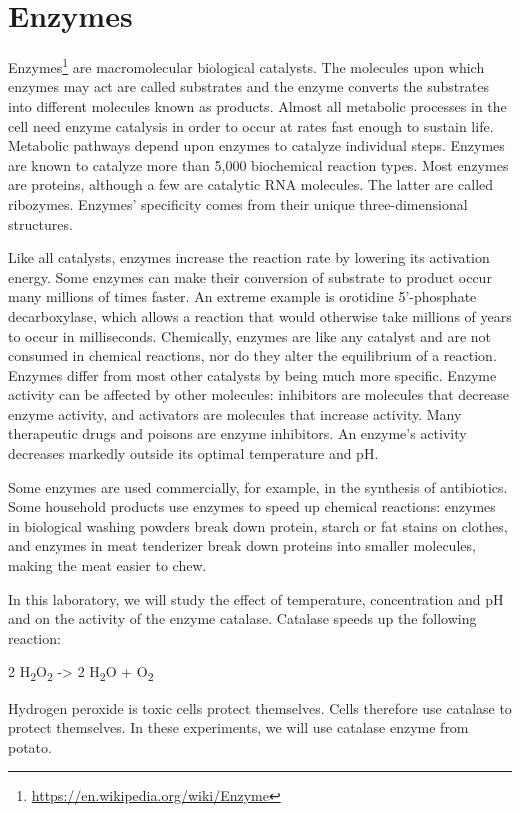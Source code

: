 \documentclass[]{book}
\let\rmarkdownfootnote\footnote%
\def\footnote{\protect\rmarkdownfootnote}
\renewcommand{\href}[2]{#2\footnote{\url{#1}}}
\theoremstyle{definition}
\theoremstyle{definition}
\theoremstyle{definition}
\theoremstyle{remark}
\begin{document}
\chapter{Enzymes}\label{enzymes}

\href{https://en.wikipedia.org/wiki/Enzyme}{Enzymes} are macromolecular
biological catalysts. The molecules upon which enzymes may act are
called substrates and the enzyme converts the substrates into different
molecules known as products. Almost all metabolic processes in the cell
need enzyme catalysis in order to occur at rates fast enough to sustain
life. Metabolic pathways depend upon enzymes to catalyze individual
steps. Enzymes are known to catalyze more than 5,000 biochemical
reaction types. Most enzymes are proteins, although a few are catalytic
RNA molecules. The latter are called ribozymes. Enzymes' specificity
comes from their unique three-dimensional structures.

Like all catalysts, enzymes increase the reaction rate by lowering its
activation energy. Some enzymes can make their conversion of substrate
to product occur many millions of times faster. An extreme example is
orotidine 5'-phosphate decarboxylase, which allows a reaction that would
otherwise take millions of years to occur in milliseconds. Chemically,
enzymes are like any catalyst and are not consumed in chemical
reactions, nor do they alter the equilibrium of a reaction. Enzymes
differ from most other catalysts by being much more specific. Enzyme
activity can be affected by other molecules: inhibitors are molecules
that decrease enzyme activity, and activators are molecules that
increase activity. Many therapeutic drugs and poisons are enzyme
inhibitors. An enzyme's activity decreases markedly outside its optimal
temperature and pH.

Some enzymes are used commercially, for example, in the synthesis of
antibiotics. Some household products use enzymes to speed up chemical
reactions: enzymes in biological washing powders break down protein,
starch or fat stains on clothes, and enzymes in meat tenderizer break
down proteins into smaller molecules, making the meat easier to chew.

In this laboratory, we will study the effect of temperature,
concentration and pH and on the activity of the enzyme catalase.
Catalase speeds up the following reaction:

2 H\textsubscript{2}O\textsubscript{2} -\textgreater{} 2
H\textsubscript{2}O + O\textsubscript{2}

Hydrogen peroxide is toxic cells protect themselves. Cells therefore use
catalase to protect themselves. In these experiments, we will use
catalase enzyme from potato.
\end{document}

